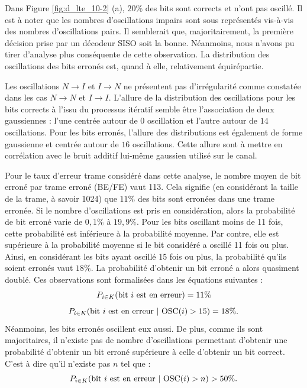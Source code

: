 
Dans Figure \ref{fig:d_lte_10-2} (a), $20\%$ des bits sont corrects et n'ont pas oscillé. Il est à noter que 
les nombres d'oscillations impairs sont sous représentés vis-à-vis des nombres d'oscillations pairs. Il semblerait que, 
majoritairement, la première décision prise par un décodeur SISO soit la bonne. Néanmoins, nous n'avons pu tirer d'analyse 
plus conséquente de 
cette observation. La distribution des oscillations des bits erronés est, quand à elle, relativement équirépartie. 

Les oscillations $N\rightarrow I$ et $I\rightarrow N$ ne présentent pas d’irrégularité comme constatée dans les cas 
$N\rightarrow N$ et $I\rightarrow I$. L'allure de la distribution des oscillations pour les bits corrects à l'issu du 
processus itératif semble être l'association de deux gaussiennes : l'une centrée autour de $0$ oscillation et l'autre 
autour de $14$ oscillations. Pour les 
bits erronés, l'allure des distributions est également de forme gaussienne et centrée autour de $16$ oscillations. Cette allure sont à
mettre en corrélation avec le bruit additif lui-même gaussien utilisé sur le canal.

Pour le taux d'erreur trame considéré dans cette analyse, le nombre moyen de bit erroné par trame erroné (BE/FE) vaut 
113. Cela signifie (en considérant la taille de la trame, à savoir 1024) que $11\%$ des bits sont erronées dans une trame erronée. 
Si le nombre d'oscillations est pris en considération, alors la probabilité de bit erroné varie de $0,1\%$ à $19,9\%$. 
Pour les bits oscillant moins de 11 fois, cette probabilité est inférieure à la probabilité moyenne. Par contre, elle
est supérieure à la probabilité moyenne si le bit considéré a oscillé 11 fois ou plus. Ainsi, en considérant les bits 
ayant oscillé 15 fois ou plus, la probabilité qu'ils soient erronés vaut $18\%$. La probabilité d'obtenir un bit 
erroné a alors quasiment doublé. Ces observations sont formalisées dans les équations suivantes :
\[P_{i \in K} (\textnormal{bit } i \textnormal{ est en erreur}) = 11 \%\]
\[P_{i \in K} (\textnormal{bit } i \textnormal{ est en erreur}\ |\ \textnormal{OSC}(i) > 15 ) = 18 \%.\]
Néanmoins, les bits erronés oscillent eux aussi. De plus, comme ils sont majoritaires, il n'existe pas de 
nombre d'oscillations permettant d'obtenir une probabilité d'obtenir un bit erroné supérieure à celle d'obtenir un bit
correct. C'est à dire qu'il n'existe pas $n$ tel que : 
\[P_{i \in K} (\textnormal{bit } i \textnormal{ est en erreur}\ |\ \textnormal{OSC}(i) > n ) > 50 \%.\]


